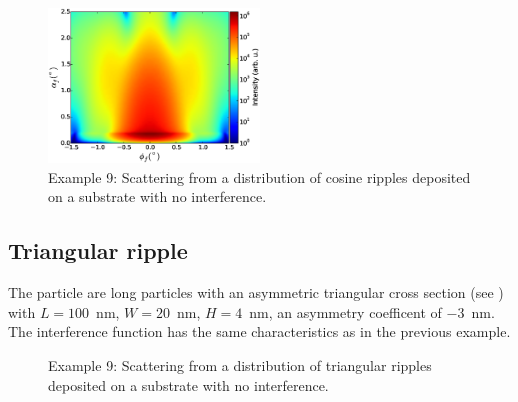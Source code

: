\begin{figure}[H]
\begin{center}
\includegraphics[width=0.5\textwidth]{Figures/figure_ex009CosRippleNoInterf.eps}
\end{center}
\caption{Example 9: Scattering from a distribution of cosine ripples deposited on a substrate with no interference.}
\label{fig:PythonEx9CosRipplenointerf}
\end{figure}

\subsection{Triangular ripple}
 The particle are long particles with an asymmetric triangular cross section (see ) with  $L=100$~nm, $W=20$~nm, $H=4$~nm, an asymmetry coefficent of $-3$~nm. The interference function has the same characteristics as in the previous example.

\begin{figure}[H]
\hfill
{}
\hfill
{}
\hfill
\caption{Example 9: Scattering from a distribution of triangular ripples deposited on a substrate with no interference.}
\label{fig:PythonEx9TriangRipple}
\end{figure}

